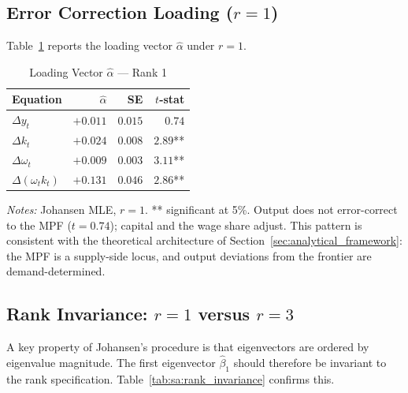\subsection{Error Correction Loading ($r=1$)}
\label{app:sa:alpha}

Table~\ref{tab:sa:alpha} reports the loading vector $\hat{\alpha}$ under
$r = 1$.

\begin{table}[htbp]
\centering
\caption{Loading Vector $\hat{\alpha}$ --- Rank 1}
\label{tab:sa:alpha}
\begin{threeparttable}
\begin{tabular}{lrrr}
\toprule
Equation & $\hat{\alpha}$ & SE & $t$-stat \\
\midrule
$\Delta y_t$              & $+0.011$ & $0.015$ & $0.74$ \\
$\Delta k_t$              & $+0.024$ & $0.008$ & $2.89$** \\
$\Delta \omega_t$         & $+0.009$ & $0.003$ & $3.11$** \\
$\Delta(\omega_t k_t)$    & $+0.131$ & $0.046$ & $2.86$** \\
\bottomrule
\end{tabular}
\begin{tablenotes}
\small
\item \textit{Notes:} Johansen MLE, $r = 1$.
** significant at 5\%. Output does not error-correct to the MPF
($t = 0.74$); capital and the wage share adjust. This pattern is
consistent with the theoretical architecture of
Section~\ref{sec:analytical_framework}: the MPF is a supply-side
locus, and output deviations from the frontier are
demand-determined.
\end{tablenotes}
\end{threeparttable}
\end{table}

\subsection{Rank Invariance: $r = 1$ versus $r = 3$}
\label{app:sa:rank_invariance}

A key property of Johansen's procedure is that eigenvectors are ordered by
eigenvalue magnitude. The first eigenvector $\hat{\beta}_1$ should therefore
be invariant to the rank specification. Table~\ref{tab:sa:rank_invariance}
confirms this.

